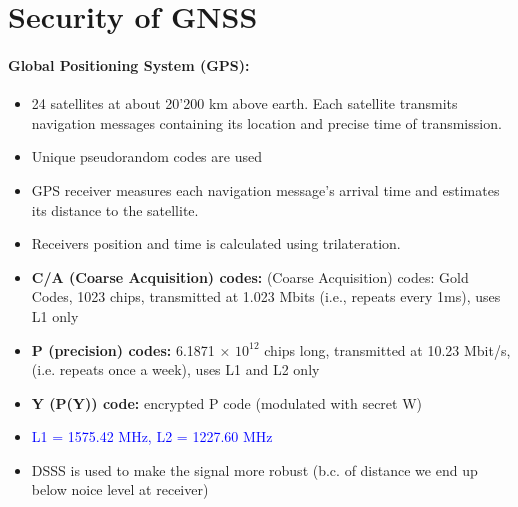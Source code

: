 \section{Security of GNSS}

\paragraph{Global Positioning System (GPS):}
\begin{itemize}
    \item 24 satellites at about 20'200 km above earth. Each satellite transmits navigation messages containing its location and precise time of transmission.
    \item Unique pseudorandom codes are used
    \item GPS receiver measures each navigation message's arrival time and estimates its distance to the satellite.
    \item Receivers position and time is calculated using trilateration.
    \item \textbf{C/A (Coarse Acquisition) codes:} (Coarse Acquisition) codes: Gold Codes, 1023 chips, transmitted at 1.023 Mbits (i.e., repeats every 1ms), uses L1 only
    \item \textbf{P (precision) codes:} 6.1871 × $10^{12}$ chips long, transmitted at 10.23 Mbit/s, (i.e. repeats once a week), uses L1 and L2 only
    \item \textbf{Y (P(Y)) code:} encrypted P code (modulated with secret W)
    \item \textcolor{blue}{L1 = 1575.42 MHz, L2 = 1227.60 MHz}
    \item DSSS is used to make the signal more robust (b.c. of distance we end up below noice level at receiver)
\end{itemize}

